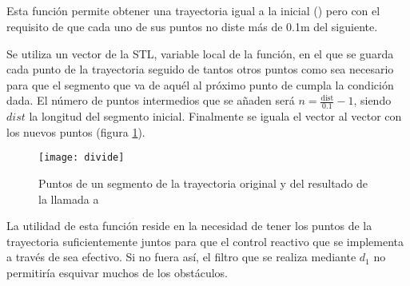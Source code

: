 %
%
%

\subsection{}

\noindent
{}

\noindent
Esta función permite obtener una trayectoria igual a la inicial () pero con el requisito de que cada uno de sus puntos no diste más de 0.1m del siguiente.

Se utiliza un vector de la STL, variable local de la función, en el que se guarda cada punto de la trayectoria seguido de tantos otros puntos como sea necesario para que el segmento que va de aquél al próximo punto de  cumpla la condición dada. El número de puntos intermedios que se añaden será $n = \frac{\mbox{dist}}{0.1} - 1$,
siendo $dist$ la longitud del segmento inicial. Finalmente se iguala el vector  al vector con los nuevos puntos (figura \ref{fg:divide}).

\begin{figure}[h]
  \centering\texttt{[image: divide]}\\
  \caption{Puntos de un segmento de la trayectoria original y del resultado de la llamada a }\label{fg:divide}
\end{figure}


La utilidad de esta función reside en la necesidad de tener los puntos de la trayectoria suficientemente juntos para que el control reactivo que se implementa a través de  sea efectivo. Si no fuera así, el filtro que se realiza mediante $d_{1}$ no permitiría esquivar muchos de los obstáculos.

